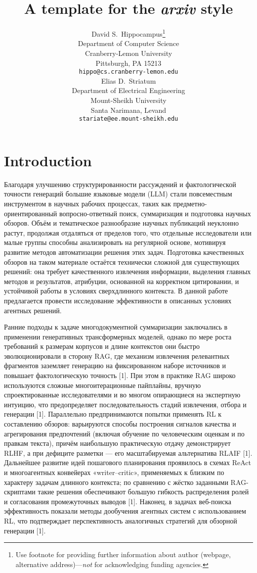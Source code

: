 \documentclass{article}
\title{A template for the \emph{arxiv} style}
\author{ David S.~Hippocampus\thanks{Use footnote for providing further
		information about author (webpage, alternative
		address)---\emph{not} for acknowledging funding agencies.} \\
	Department of Computer Science\\
	Cranberry-Lemon University\\
	Pittsburgh, PA 15213 \\
	\texttt{hippo@cs.cranberry-lemon.edu} \\
	\And
	Elias D.~Striatum \\
	Department of Electrical Engineering\\
	Mount-Sheikh University\\
	Santa Narimana, Levand \\
	\texttt{stariate@ee.mount-sheikh.edu} \\
}
\date{}
\begin{document}
\maketitle

\begin{abstract}
	\lipsum[1]
\end{abstract}



\section{Introduction}
Благодаря улучшению структурированности рассуждений и фактологической точности генераций большие языковые модели (LLM) стали повсеместным инструментом в научных рабочих процессах, таких как предметно-ориентированный вопросно-ответный поиск, суммаризация и подготовка научных обзоров. Объём и тематическое разнообразие научных публикаций неуклонно растут, продолжая отдаляться от пределов того, что отдельные исследователи или малые группы способны анализировать на регулярной основе, мотивируя развитие методов автоматизации решения этих задач. Подготовка качественных обзоров на таком материале остаётся технически сложной для существующих решений: она требует качественного извлечения информации, выделения главных методов и результатов, атрибуции, основанной на корректном цитировании, и устойчивой работы в условиях сверхдлинного контекста. В данной работе предлагается провести исследование эффективности в описанных условиях агентных решений.

Ранние подходы к задаче многодокументной суммаризации заключались в применении генеративных трансформерных моделей, однако по мере роста требований к размерам корпусов и длине контекстов они быстро эволюционировали в сторону RAG, где механизм извлечения релевантных фрагментов заземляет генерацию на фиксированном наборе источников и повышает фактологическую точность [1]. При этом в практике RAG широко используются сложные многоитерационные пайплайны, вручную спроектированные исследователями и во многом опирающиеся на экспертную интуицию, что предопределяет последовательность стадий извлечения, отбора и генерации [1]. Параллельно предпринимаются попытки применять RL к составлению обзоров: варьируются способы построения сигналов качества и агрегирования предпочтений (включая обучение по человеческим оценкам и по правкам текста), причём наибольшую практическую отдачу демонстрирует RLHF, а при дефиците разметки — его масштабируемая альтернатива RLAIF [1]. Дальнейшее развитие идей пошагового планирования проявилось в схемах ReAct и многоагентных конвейерах «writer–critic», применяемых к близким по характеру задачам длинного контекста; по сравнению с жёстко заданными RAG-скриптами такие решения обеспечивают большую гибкость распределения ролей и согласования промежуточных выводов [1]. Наконец, в задачах веб-поиска эффективность показали методы дообучения агентных систем с использованием RL, что подтверждает перспективность аналогичных стратегий для обзорной генерации [1].
\end{document}
